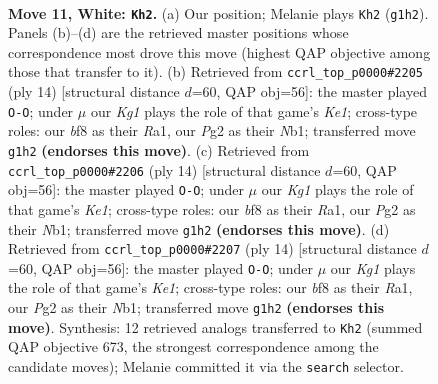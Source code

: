 \documentclass[11pt]{article}
\begin{document}
\clearpage

\begin{figure}[p]\centering
\begin{subfigure}{0.46\textwidth}\centering
\resizebox{\linewidth}{!}{%
\newchessgame
\chessboard[
  setfen={r1bqkb1r/pp3ppp/2np4/3pP3/3P3P/5N2/PP3PP1/RNBQ1RK1 w q - 0 11},
  showmover=false,
  pgfstyle=straightmove, color=movearrow, markmove={g1-h2}
]}
\caption{}
\end{subfigure}\hfill
\begin{subfigure}{0.46\textwidth}\centering
\resizebox{\linewidth}{!}{%
\newchessgame
\chessboard[
  setfen={r1bqkb1r/pp3ppp/2npp3/3nP3/2BP4/5N2/PP3PPP/RNBQK2R w KQkq - 0 8},
  showmover=false,
  pgfstyle=straightmove, color=movearrow, markmove={e1-g1}
]}
\caption{}
\end{subfigure}
\\[4pt]
\begin{subfigure}{0.46\textwidth}\centering
\resizebox{\linewidth}{!}{%
\newchessgame
\chessboard[
  setfen={r1bqkb1r/pp3ppp/2npp3/3nP3/2BP4/5N2/PP3PPP/RNBQK2R w KQkq - 0 8},
  showmover=false,
  pgfstyle=straightmove, color=movearrow, markmove={e1-g1}
]}
\caption{}
\end{subfigure}\hfill
\begin{subfigure}{0.46\textwidth}\centering
\resizebox{\linewidth}{!}{%
\newchessgame
\chessboard[
  setfen={r1bqkb1r/pp3ppp/2npp3/3nP3/2BP4/5N2/PP3PPP/RNBQK2R w KQkq - 0 8},
  showmover=false,
  pgfstyle=straightmove, color=movearrow, markmove={e1-g1}
]}
\caption{}
\end{subfigure}
\caption{\textbf{Move 11, White: \texttt{Kh2}.} (a) Our position; Melanie plays \texttt{Kh2} (\texttt{g1h2}). Panels (b)--(d) are the retrieved master positions whose correspondence most drove this move (highest QAP objective among those that transfer to it). (b) Retrieved from \texttt{ccrl\_top\_p0000\#2205} (ply 14) [structural distance $d$=60, QAP obj=56]: the master played \texttt{O-O}; under $\mu$ our \emph{Kg1} plays the role of that game's \emph{Ke1}; cross-type roles: our \emph{b}f8 as their \emph{R}a1, our \emph{P}g2 as their \emph{N}b1; transferred move \texttt{g1h2} \textbf{(endorses this move)}. (c) Retrieved from \texttt{ccrl\_top\_p0000\#2206} (ply 14) [structural distance $d$=60, QAP obj=56]: the master played \texttt{O-O}; under $\mu$ our \emph{Kg1} plays the role of that game's \emph{Ke1}; cross-type roles: our \emph{b}f8 as their \emph{R}a1, our \emph{P}g2 as their \emph{N}b1; transferred move \texttt{g1h2} \textbf{(endorses this move)}. (d) Retrieved from \texttt{ccrl\_top\_p0000\#2207} (ply 14) [structural distance $d$=60, QAP obj=56]: the master played \texttt{O-O}; under $\mu$ our \emph{Kg1} plays the role of that game's \emph{Ke1}; cross-type roles: our \emph{b}f8 as their \emph{R}a1, our \emph{P}g2 as their \emph{N}b1; transferred move \texttt{g1h2} \textbf{(endorses this move)}. Synthesis: 12 retrieved analogs transferred to \texttt{Kh2} (summed QAP objective 673, the strongest correspondence among the candidate moves); Melanie committed it via the \texttt{search} selector.}
\label{fig:thought-m20}
\end{figure}
\end{document}
